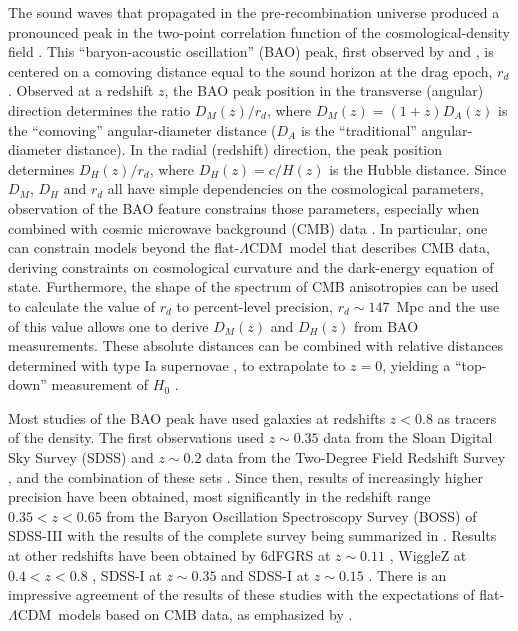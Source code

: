 \documentclass{aa}
\newcommand{\DA}{D_A}
\newcommand{\DM}{D_M}
\newcommand{\DHub}{D_H}
\newcommand{\lcdm}{$\Lambda$CDM~}
\begin{document}
The sound waves that propagated in the pre-recombination universe
produced a pronounced peak in the two-point 
correlation function of the cosmological-density field
\citep{1970ApJ...162..815P,1970Ap&SS...7....3S}.
This ``baryon-acoustic oscillation'' (BAO) peak, first
observed by \citet{2005ApJ...633..560E} and \citet{2005MNRAS.362..505C},
is centered on a
comoving distance equal to 
the  sound horizon at the drag epoch, $r_d$.
Observed  at a redshift $z$, the BAO peak position in 
the transverse (angular) direction determines the ratio
$\DM(z)/r_d$, where $\DM(z)=(1+z)\DA(z)$ is the ``comoving''
angular-diameter distance  ($\DA$ is the ``traditional''
angular-diameter distance).
In the radial (redshift) direction, the peak position determines 
$\DHub(z)/r_d$, where $\DHub(z)=c/H(z)$ is the Hubble distance.
Since $\DM$, $\DHub$ and $r_d$ all have simple dependencies on the
cosmological parameters, observation of the BAO feature constrains
those parameters, especially when combined
with cosmic microwave background
(CMB) data \citep{2014A&A...571A..16P,2016A&A...594A..13P,2015PhRvD..92l3516A}.
In particular, one can constrain models beyond the flat-\lcdm model
that describes CMB data, deriving constraints on
cosmological curvature and the dark-energy equation of state.
Furthermore,
the shape of the spectrum of CMB anisotropies can be used to calculate
the value of $r_d$ to percent-level precision,
$r_d\sim147$~Mpc
and the use of this value allows one to 
derive  $\DM(z)$ and $\DHub(z)$ from BAO measurements.
These absolute distances can be 
combined with relative distances determined with type Ia supernovae
\citep{2014A&A...568A..22B},
to extrapolate to $z=0$, yielding a
``top-down'' measurement of $H_0$ \citep{2015PhRvD..92l3516A}. 


Most studies of the BAO peak have used 
galaxies at redshifts $z<0.8$ as tracers of the density.
The first observations used $z\sim 0.35$ data from the 
Sloan Digital Sky Survey (SDSS) \citep{2005ApJ...633..560E} 
and $z\sim0.2$ data from the
Two-Degree Field Redshift Survey 
\citep{2005MNRAS.362..505C},
and the combination of
these sets \citep{2007MNRAS.381.1053P,2010MNRAS.401.2148P}.
Since then,
results of increasingly higher precision have
been obtained, most significantly in the redshift range  $0.35<z<0.65$ from
the Baryon Oscillation Spectroscopy Survey (BOSS) of SDSS-III 
\citep{2012MNRAS.427.3435A,2014MNRAS.439...83A,2014MNRAS.441...24A}
with the results of the complete survey being summarized in
\citet{2016arXiv160703155A}. 
Results at other redshifts have been obtained by
6dFGRS at $z\sim0.11$ \citep{2011MNRAS.416.3017B},
WiggleZ at $0.4<z<0.8$ \citep{2011MNRAS.415.2892B}, 
SDSS-I  at $z\sim0.35$ \citep{2012MNRAS.427.2132P,2012MNRAS.427.2168M,2012MNRAS.426..226C,2013MNRAS.431.2834X} and
SDSS-I at
$z\sim0.15$ \citep{2015MNRAS.449..835R}.
There is an impressive agreement of the results of these studies 
with the expectations
of flat-\lcdm models based on CMB data, as emphasized
by \citet{2016A&A...594A..13P}.
\end{document}
